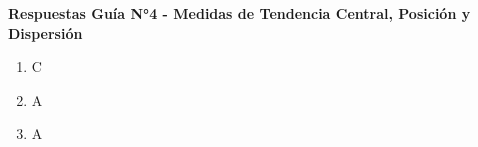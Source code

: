 \documentclass[12pt, a4paper]{article}
\newcommand{\respitem}[1]{\item[\textbf{#1.}]} %
\begin{document}
\begin{center}
    \Large\textbf{Respuestas Guía N°4 - Medidas de Tendencia Central, Posición y Dispersión}
\end{center}
\vspace{0.5cm}


\begin{enumerate}
    \respitem{1} C
    \respitem{2} A %
    \respitem{3} A %

\end{enumerate}
\end{document}
